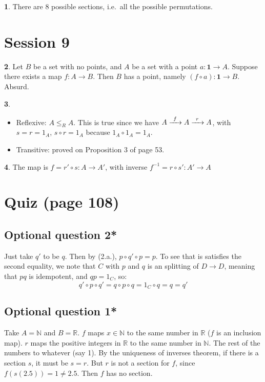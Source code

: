 \documentclass{article}
\theoremstyle{definition}
\newcommand{\bb}[1]{\mathbb{#1}}
\newcommand{\R}{\bb{R}}
\newcommand{\N}{\bb{N}}
\theoremstyle{definition}
\theoremstyle{definition}
\newtheorem{solution-internal}{}[subsection]
\newenvironment{solution}{
  \begin{solution-internal}
}{
  \end{solution-internal}
}
\begin{document}
\begin{solution}
  There are 8 possible sections, i.e.\ all the possible permutations.
\end{solution}

\section*{Session 9}
\setcounter{subsection}{9}
\setcounter{solution-internal}{0}

\begin{solution}
  Let $B$ be a set with no points, and $A$ be a set with a point $a \colon
  \mathbf{1} \to A$. Suppose there exists a map $f\colon A \to B$. Then $B$ has
  a point, namely $(f \circ a) \colon \mathbf{1} \to B$. Absurd.
\end{solution}

\begin{solution}
  $ $
  \begin{itemize}
    \item Reflexive: $A \leq_{R} A$. This is true since we have $A
  \xrightarrow{\mathmakebox[12pt]{f}} A \xrightarrow{\mathmakebox[12pt]{r}} A$,
  with $s = r = 1_A$, $s \circ r = 1_A$ because $1_A \circ 1_A = 1_A$.
\item Transitive: proved on Proposition 3 of page 53.
  \end{itemize}
\end{solution}

\begin{solution}
  The map is $f = r' \circ s \colon A \to A'$, with inverse $f^{-1} = r \circ s' \colon A' \to A$
\end{solution}

\section*{Quiz (page 108)}
\subsection*{Optional question 2*} 
Just take $q'$ to be $q$. Then by (2.a.), $p \circ q' \circ p = p$. To see that
is satisfies the second equality, we note that $C$ with $p$ and $q$ is an
splitting of $D \to D$, meaning that $pq$ is idempotent, and $qp = 1_C$, so:
\[ q' \circ p \circ q' = q \circ p \circ q = 1_C \circ q = q = q' \]
\subsection*{Optional question 1*} 
Take $A = \N$ and $B = \R$. $f$ maps $x \in \N$ to the same number in $\R$ ($f$
is an inclusion map). $r$ maps the positive integers in $\R$ to the same number
in $\N$. The rest of the numbers to whatever (say 1). By the uniqueness of
inverses theorem, if there is a section $s$, it must be $s = r$. But $r$ is not
a section for $f$, since $f(s(2.5)) = 1 \neq 2.5$. Then $f$ has no section.
\end{document}
